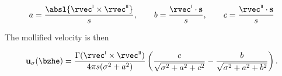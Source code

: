 \begin{equation}
  a = \frac{\absl{\rvec^{\romani} \times \rvec^{\romanii}}}{s}, \qquad b = \frac{\rvec^{\romani} \cdot \svec}{s}, \qquad c = \frac{\rvec^{\romanii} \cdot \svec}{s}
\end{equation}

\noindent
The mollified velocity is then

\begin{equation}
  \uvec_{\sigma} (\bzhe) = \frac{\Gamma (\rvec^{\romani} \times \rvec^{\romanii})}{4 \pi s (\sigma^2 + a^2)} \left( \frac{c}{\sqrt{\sigma^2 + a^2 + c^2}} - \frac{b}{\sqrt{\sigma^2 + a^2 + b^2}} \right).
\end{equation}
